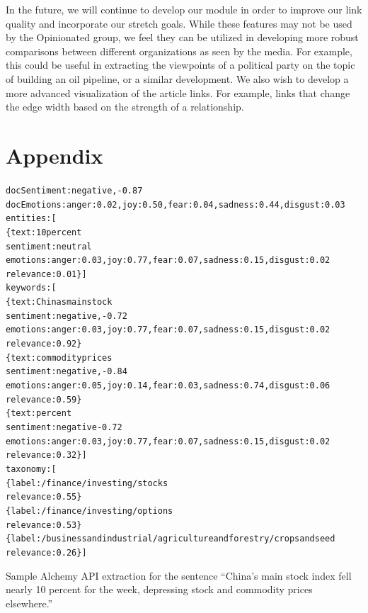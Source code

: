 \documentclass[12pt]{article}
\begin{document}
In the future, we will continue to develop our module in order to improve our link quality and incorporate our stretch goals. While these features may not be used by the Opinionated group, we feel they can be utilized in developing more robust comparisons between different organizations as seen by the media. For example, this could be useful in extracting the viewpoints of a political party on the topic of building an oil pipeline, or a similar development. We also wish to develop a more advanced visualization of the article links. For example, links that change the edge width based on the strength of a relationship.

\newpage
\section{Appendix}
\begin{alltt}
docSentiment: negative, -0.87
docEmotions: anger: 0.02, joy: 0.50, fear: 0.04, sadness: 0.44, disgust: 0.03
entities: [
  \{ text: 10 percent
    sentiment: neutral
    emotions: anger: 0.03, joy: 0.77, fear: 0.07, sadness: 0.15, disgust: 0.02
    relevance: 0.01 \} ]
keywords: [
  \{ text: Chinas main stock
    sentiment: negative, -0.72
    emotions: anger: 0.03, joy: 0.77, fear: 0.07, sadness: 0.15, disgust: 0.02
    relevance: 0.92 \}
  \{ text: commodity prices
    sentiment: negative, -0.84
    emotions: anger: 0.05, joy: 0.14, fear: 0.03, sadness: 0.74, disgust: 0.06
    relevance: 0.59 \}
  \{ text: percent
    sentiment: negative -0.72
    emotions: anger: 0.03, joy: 0.77, fear: 0.07, sadness: 0.15, disgust: 0.02
    relevance: 0.32 \} ]
taxonomy: [
  \{ label: /finance/investing/stocks
    relevance: 0.55 \}
  \{ label: /finance/investing/options
    relevance: 0.53 \}
  \{ label: /business and industrial/agriculture and forestry/crops and seed
    relevance: 0.26 \} ]
\end{alltt}
Sample Alchemy API extraction for the sentence ``China's main stock index fell nearly 10 percent for the week, depressing stock and commodity prices elsewhere.''
\end{document}
